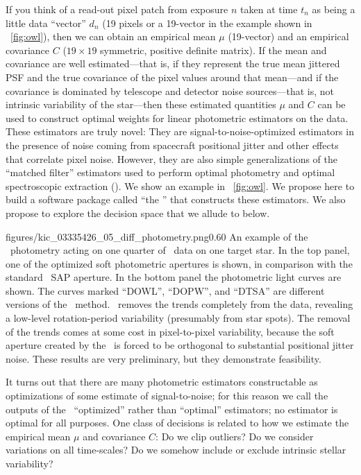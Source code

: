 \documentclass[letterpaper,12pt,preprint]{hack_aastex}
\begin{document}
If you think of a read-out pixel patch from exposure $n$ taken at time
$t_n$ as being a little data ``vector'' $d_n$ (19 pixels or a 19-vector
in the example shown in \figurename~\ref{fig:owl}), then we can obtain an
empirical mean $\mu$ (19-vector) and an empirical covariance $C$ ($19\times 19$
symmetric, positive definite matrix).
If the mean and covariance are well estimated---that is, if they
represent the true mean jittered PSF and the true covariance of the
pixel values around that mean---and if the covariance is dominated by
telescope and detector noise sources---that is, not intrinsic
variability of the star---then these estimated quantities $\mu$ and
$C$ can be used to construct optimal weights for linear photometric
estimators on the data.
These estimators are truly novel:
They are signal-to-noise-optimized estimators in the presence of noise coming
from spacecraft positional jitter and other effects that correlate pixel noise.
However, they are also simple generalizations of the ``matched filter''
estimators used to perform optimal photometry and optimal spectroscopic
extraction (\citealt{matched-filter}).
We show an example in \figurename~\ref{fig:owl}.
We propose here to build a software package called ``the \OWL'' that constructs
these estimators.
We also propose to explore the decision space that we allude to below.

%
            {figures/kic_03335426_05_diff_photometry.png}{0.60}{%
An example of the \OWL\ photometry acting on one quarter of \Kepler\ data
on one target star.
In the top panel, one of the optimized soft photometric apertures is shown,
in comparison with the standard \Kepler\ SAP aperture.
In the bottom panel the photometric light curves are shown.
The curves marked ``DOWL'', ``DOPW'', and ``DTSA'' are different versions of the
\OWL\ method.
\OWL\ removes the trends completely from the data,
revealing a low-level rotation-period variability (presumably from star spots).
The removal of the trends comes at some cost in pixel-to-pixel variability,
because the soft aperture created by the \OWL\ is forced to be orthogonal to
substantial positional jitter noise.
These results are very preliminary, but they demonstrate feasibility.
\label{fig:owl}}

It turns out that there are many photometric estimators constructable as
optimizations of some estimate of signal-to-noise; for this reason we call
the outputs of the \OWL\ ``optimized'' rather than ``optimal'' estimators;
no estimator is optimal for all purposes.
One class of decisions is related to how we estimate the empirical mean $\mu$
and covariance $C$:
Do we clip outliers?
Do we consider variations on all time-scales?
Do we somehow include or exclude intrinsic stellar variability?
\end{document}
